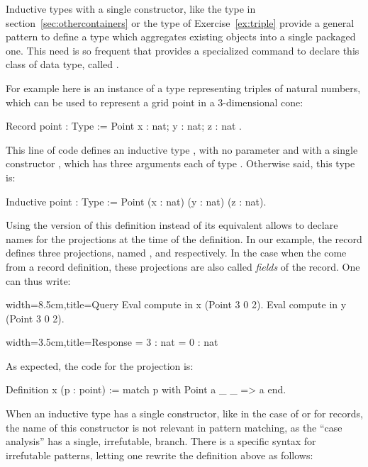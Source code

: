 Inductive types with a single constructor, like the type  in
section~\ref{sec:othercontainers} or the type  of
Exercise~\ref{ex:triple} provide a general pattern to define a type
which aggregates existing objects into a single packaged one. This
need is so frequent that \Coq{} provides a specialized command
to declare this class of data type, called .

For example here is an instance of a type representing triples of
natural numbers, which can be used to represent a grid point in a
3-dimensional cone:

\begin{coq}{}{}
Record point : Type := Point { x : nat; y : nat; z : nat }.
\end{coq}
This line of code defines an inductive type , with no
parameter and with a single constructor , which has three
arguments each of type . Otherwise said, this type is:

\begin{coq}{}{}
Inductive point : Type := Point (x : nat) (y : nat) (z : nat).
\end{coq}

Using the  version of this definition instead of its
equivalent  allows to declare names for the projections
at the time of the definition. In our example, the record 
defines three projections, named ,  and 
respectively. In the case when the come from a record definition,
these projections are also called \emph{fields} of the record.
One can thus write:

\begin{coq}{}{width=8.5cm,title=Query}
Eval compute in x (Point 3 0 2).
Eval compute in y (Point 3 0 2).
\end{coq}{}{}
\begin{coqout}{}{width=3.5cm,title=Response}
= 3 : nat
= 0 : nat
\end{coqout}{}{}
As expected, the code for the  projection is:

\begin{coq}{}{}
Definition x (p : point) := match p with Point a _ _ => a end.
\end{coq}

When an inductive type has a single constructor, like in the case of
 or for records, the name of this constructor is not relevant
in pattern matching, as the ``case analysis'' has a single, irrefutable,
branch. There is a specific syntax for irrefutable patterns, letting
one rewrite the definition above as follows:

